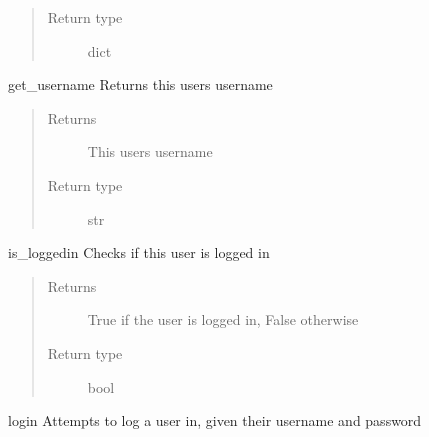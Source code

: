 \documentclass[letterpaper,10pt,english]{sphinxmanual}
\begin{document}
\begin{fulllineitems}
\begin{fulllineitems}
\begin{quote}
\begin{description}
\item[{Return type}] \leavevmode
dict

\end{description}\end{quote}

\end{fulllineitems}


\begin{fulllineitems}
\label{\detokenize{index:data.user.User.get_username}}
get\_username Returns this users username
\begin{quote}\begin{description}
\item[{Returns}] \leavevmode
This users username

\item[{Return type}] \leavevmode
str

\end{description}\end{quote}

\end{fulllineitems}


\begin{fulllineitems}
\label{\detokenize{index:data.user.User.is_loggedin}}
is\_loggedin Checks if this user is logged in
\begin{quote}\begin{description}
\item[{Returns}] \leavevmode
True if the user is logged in, False otherwise

\item[{Return type}] \leavevmode
bool

\end{description}\end{quote}

\end{fulllineitems}


\begin{fulllineitems}
\label{\detokenize{index:data.user.User.login}}
login Attempts to log a user in, given their username and password


\end{fulllineitems}
\end{fulllineitems}
\end{document}
